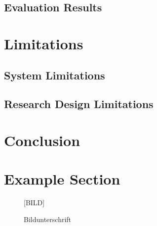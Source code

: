 \documentclass[11pt,a4paper,twoside]{article}
\begin{document}
\subsection{Evaluation Results} \label{EvalResults}


\cleardoublepage

\section{Limitations}

\subsection{System Limitations}

\subsection{Research Design Limitations}


\cleardoublepage

\section{Conclusion}


\iffalse

\cleardoublepage %
\section{Example Section}

\begin{figure}%


  \begin{center}\LARGE [BILD]\end{center}
  \caption{Bildunterschrift}
  \label{fig:beispielbild}
\end{figure}
\end{document}
